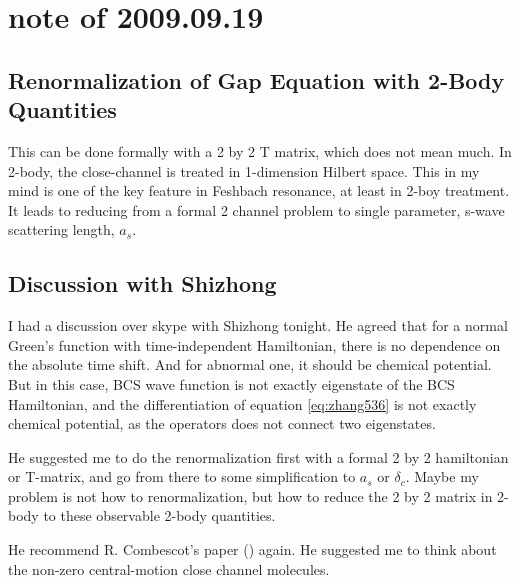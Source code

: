\section{note of 2009.09.19}
\subsection{Renormalization of Gap Equation with 2-Body Quantities}
This can be done formally with a 2 by 2 T matrix, which does not mean much.  In 2-body, the close-channel is treated in 1-dimension Hilbert space. This in my mind is one of the key feature in Feshbach resonance, at least in 2-boy treatment.  It leads to reducing from a formal 2 channel problem to single parameter, s-wave scattering length, $a_s$.  

\subsection{Discussion with Shizhong}
I had a discussion over skype with Shizhong tonight.  He agreed that for a normal Green's function with time-independent Hamiltonian, there is no dependence on the absolute time shift.  And for abnormal one, it should be chemical potential. But in this case, BCS wave function is not exactly eigenstate of the BCS Hamiltonian, and the differentiation of equation \eqref{eq:zhang536} is not exactly chemical potential, as the operators does not connect two eigenstates. 

He suggested me to do the renormalization first with a formal 2 by 2 hamiltonian or T-matrix, and go from there to some simplification to $a_s$ or $\delta_c$.  Maybe my problem is not how to renormalization, but how to reduce the 2 by 2 matrix in 2-body to these observable 2-body quantities.    

He recommend R. Combescot's paper (\cite{rCombescot,rCombescot2}) again. He suggested me to think about the non-zero central-motion close channel molecules.  
